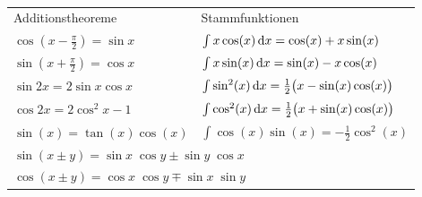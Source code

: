 \documentclass[fs, footer]{latex4ei}
\begin{document}
\begin{multicols*}{4}
{\setlength{\tabcolsep}{4pt}
\\
\begin{tabular*}{\columnwidth}{@{\extracolsep\fill}ll@{}}
	Additionstheoreme &  Stammfunktionen\\
 	$\cos (x - \frac{\pi}{2}) = \sin x$ & $\int x \cos(x) \diff x = \cos(x) + x \sin(x)$\\
 	$\sin (x + \frac{\pi}{2}) = \cos x$ & $\int x \sin(x) \diff x = \sin(x) - x \cos(x)$\\
 	$\sin 2x = 2 \sin x \cos x $  & $\int \sin^2(x) \diff x = \frac12 \bigl(x - \sin(x)\cos(x) \bigr)$\\ 
 	$\cos 2x = 2\cos^2 x - 1$  & $\int \cos^2(x) \diff x = \frac12 \bigl(x + \sin(x)\cos(x) \bigr)$\\
 	$\sin(x) = \tan(x)\cos(x)$ & $\int \cos(x)\sin(x) = -\frac12 \cos^2(x)$ \\
 	\multicolumn{2}{l}{$\sin ( x \pm y ) = \sin x \; \cos y \pm \sin y \; \cos x$}\\
 	\multicolumn{2}{l}{$\cos ( x \pm y ) = \cos x \; \cos y \mp \sin x \; \sin y$}\\
\end{tabular*}
}

\sectionbox{
}
\end{multicols*}
\end{document}
